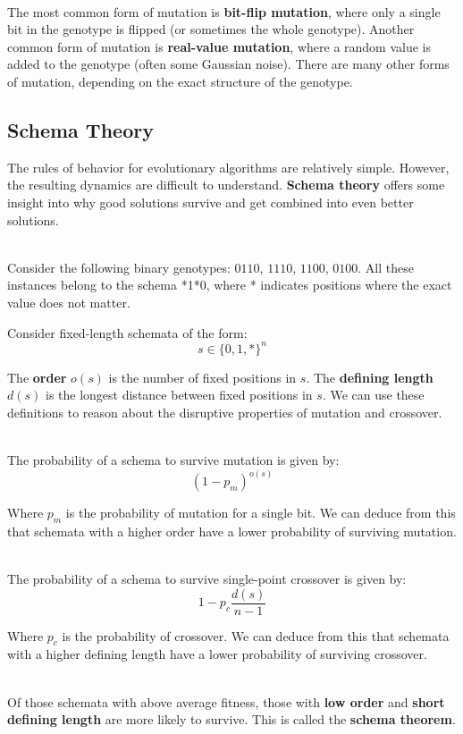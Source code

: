\documentclass[12pt]{article}
\begin{document}
\noindent
\\
The most common form of mutation is \textbf{bit-flip mutation}, where only a single bit in the genotype is flipped (or sometimes the whole genotype).
Another common form of mutation is \textbf{real-value mutation}, where a random value is added to the genotype (often some Gaussian noise).
There are many other forms of mutation, depending on the exact structure of the genotype.

\subsection{Schema Theory}
The rules of behavior for evolutionary algorithms are relatively simple.
However, the resulting dynamics are difficult to understand.
\textbf{Schema theory} offers some insight into why good solutions survive and get combined into even better solutions.

\noindent
\\
Consider the following binary genotypes: $0110$, $1110$, $1100$, $0100$.
All these instances belong to the schema *1*0, where * indicates positions where the exact value does not matter.

\newpage
\noindent
Consider fixed-length schemata of the form:
\[ s \in \{0, 1, \text{*}\}^n \]

\noindent
The \textbf{order} $o(s)$ is the number of fixed positions in $s$.
The \textbf{defining length} $d(s)$ is the longest distance between fixed positions in $s$.
We can use these definitions to reason about the disruptive properties of mutation and crossover.

\noindent
\\
The probability of a schema to survive mutation is given by:
\[ \left( 1 - p_m \right)^{o(s)} \]

\noindent
Where $p_m$ is the probability of mutation for a single bit.
We can deduce from this that schemata with a higher order have a lower probability of surviving mutation.

\noindent
\\
The probability of a schema to survive single-point crossover is given by:
\[ 1 - p_c \frac{d(s)}{n - 1} \]

\noindent
Where $p_c$ is the probability of crossover.
We can deduce from this that schemata with a higher defining length have a lower probability of surviving crossover.

\noindent
\\
Of those schemata with above average fitness, those with \textbf{low order} and \textbf{short defining length} are more likely to survive.
This is called the \textbf{schema theorem}.
\end{document}
